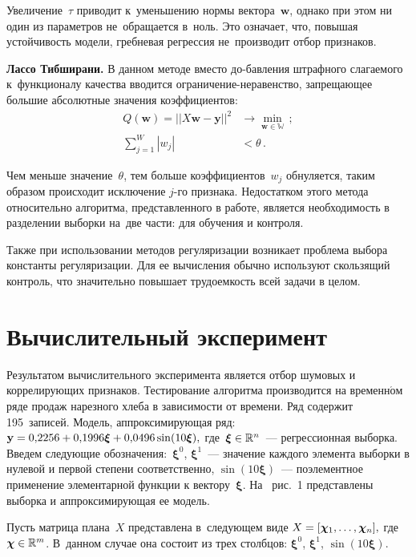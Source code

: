 \begin{multicols}{2}
Увеличение~$\tau$ приводит к~уменьшению нормы вектора~$\mathbf{w}$,
однако при этом ни один из параметров не~обращается в~ноль. Это означает, что,
повышая устойчивость модели, гребневая регрессия не~производит отбор
признаков.

\smallskip

\textbf{Лассо Тибширани.}
В данном методе вместо до-\linebreak бав\-ле\-ния штрафного слагаемого к~функционалу
качест\-ва вводится ограничение-неравенство, запрещающее большие
абсолютные значения коэффициентов:
\begin{align*}
Q(\mathbf{w})=||X\mathbf{w}-\mathbf{y}||^2 &\rightarrow \min\limits_\mathbf{w\in\mathbb{W}}\,;\\[9pt]
\sum\limits_{j=1}^W |w_j|&<\theta\,.
\end{align*}

Чем меньше значение~$\theta$, тем больше коэффициентов~$w_j$
обнуляется, таким образом происходит исключение $j$-го признака.
Недостатком этого метода относительно алгоритма, представленного
в работе, является необходимость в разделении выборки на~две части:
для обучения и контроля.

Также при использовании методов регуляризации возникает проблема
выбора константы регуляризации. Для ее вычисления обычно используют
скользящий контроль, что значительно повышает трудоемкость всей
задачи в целом.

\section{Вычислительный эксперимент}

Результатом вычислительного эксперимента является отбор шумовых
и коррелирующих признаков. Тестирование алгоритма производится
на временн$\acute{\mbox{о}}$м ряде продаж нарезного хлеба в зависимости от времени.
Ряд содержит 195~записей. Модель, аппроксимирующая ряд:
$\mathbf{y}\hm=0{,}2256\hm+0{,}1996\boldsymbol{\xi}\hm+0{,}0496\sin(10\boldsymbol{\xi}),$
где~$\boldsymbol{\xi} \hm\in \mathbb{R}^n$~--- регрессионная выборка.
Введем следующие обозначения:~$\boldsymbol{\xi}^0$,
$\boldsymbol{\xi}^1$~--- значение каждого элемента выборки в нулевой
и первой степени соответственно, $\sin(10\boldsymbol{\xi})$~---
поэлементное применение элементарной функции
к вектору~$\boldsymbol{\xi}$. На~ рис.~1 представлены
выборка и аппроксимирующая ее модель.



Пусть матрица плана~$X$ представлена в~сле\-ду\-ющем
виде $X\hm=[\boldsymbol{\chi}_1,\ldots ,\boldsymbol{\chi}_n],$
где $\boldsymbol{\chi}\hm \in \mathbb{R}^m$. В~данном случае она
состоит из трех столбцов: $\boldsymbol{\xi}^0$,
$\boldsymbol{\xi}^1$, $\sin(10\boldsymbol{\xi})$.


\end{multicols}

